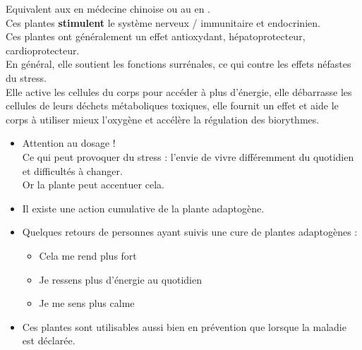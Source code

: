 \begin{Remarque}
    Equivalent aux  en médecine chinoise ou au  en .\\
    Ces plantes \textbf{stimulent} le système nerveux / immunitaire et endocrinien.\\
    Ces plantes ont généralement un effet antioxydant, hépatoprotecteur, cardioprotecteur.\\
    En général, elle soutient les fonctions surrénales, ce qui contre les effets néfastes du stress.\\
    Elle active les cellules du corps pour accéder à plus d'énergie, elle débarrasse les cellules de leurs déchets métaboliques toxiques, 
    elle fournit un effet  
    et aide le corps à utiliser mieux l'oxygène et accélère la régulation des biorythmes.\\

\end{Remarque}
\begin{Remarque}
    \begin{itemize}
        \item Attention au dosage !\\
            Ce qui peut provoquer du stress : l’envie de vivre différemment du quotidien et 
            difficultés à changer. \\
            Or la plante peut accentuer cela.
        \item Il existe une action cumulative de la plante adaptogène.
        \item Quelques retours de personnes ayant suivis une cure de plantes adaptogènes :\\
                \begin{multicols}{3}
                    \begin{itemize}
                        \item Cela me rend plus fort
                        \item Je ressens plus d'énergie au quotidien
                        \item Je me sens plus calme
                    \end{itemize}
                \end{multicols}
        \item Ces plantes sont utilisables aussi bien en prévention que lorsque la maladie est déclarée.
    \end{itemize}
\end{Remarque}
